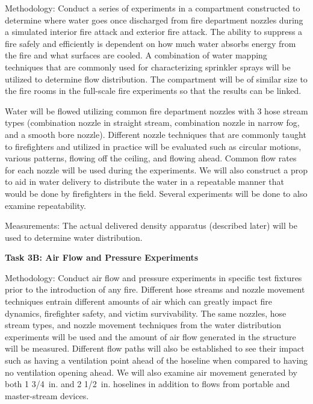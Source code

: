 \documentclass{article}
\begin{document}
\begin{itemize}
Methodology: Conduct a series of experiments in a compartment constructed to determine where water goes once discharged from fire department nozzles during a simulated interior fire attack and exterior fire attack. The ability to suppress a fire safely and efficiently is dependent on how much water absorbs energy from the fire and what surfaces are cooled. A combination of water mapping techniques that are commonly used for characterizing sprinkler sprays will be utilized to determine flow distribution. The compartment will be of similar size to the fire rooms in the full-scale fire experiments so that the results can be linked.

Water will be flowed utilizing common fire department nozzles with 3 hose stream types (combination nozzle in straight stream, combination nozzle in narrow fog, and a smooth bore nozzle). Different nozzle techniques that are commonly taught to firefighters and utilized in practice will be evaluated such as circular motions, various patterns, flowing off the ceiling, and flowing ahead. Common flow rates for each nozzle will be used during the experiments. We will also construct a prop to aid in water delivery to distribute the water in a repeatable manner that would be done by firefighters in the field. Several experiments will be done to also examine repeatability.  

Measurements: The actual delivered density apparatus (described later) will be used to determine water distribution. 
\vspace*{\baselineskip}

\clearpage

\subitem \bf{Task 3B:  Air Flow and Pressure Experiments}
\normalfont
\vspace*{\baselineskip}

Methodology: Conduct air flow and pressure experiments in specific test fixtures prior to the introduction of any fire. Different hose streams and nozzle movement techniques entrain different amounts of air which can greatly impact fire dynamics, firefighter safety, and victim survivability. The same nozzles, hose stream types, and nozzle movement techniques from the water distribution experiments will be used and the amount of air flow generated in the structure will be measured. Different flow paths will also be established to see their impact such as having a ventilation point ahead of the hoseline when compared to having no ventilation opening ahead. We will also examine air movement generated by both 1 3/4~in. and 2 1/2~in. hoselines in addition to flows from portable and master-stream devices.


\end{itemize}
\end{document}
